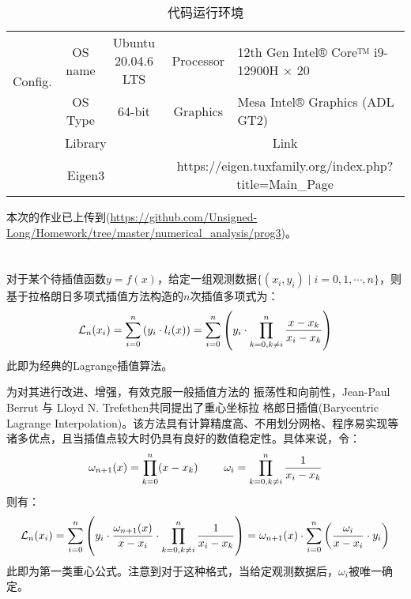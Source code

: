 \documentclass[12pt, onecolumn]{article}
\newcommand\normf{\fangsong}
\begin{document}
		\begin{table}[h]
		\centering
		\caption{\normf 代码运行环境}
		\label{tab:代码运行环境}
		\vspace{2mm}
		\begin{tabular}{ccc|cl}
		\toprule
		\multicolumn{1}{c|}{\multirow{2}{*}{Config.}} & OS name & Ubuntu 20.04.6 LTS & Processor              & 12th Gen Intel® Core™ i9-12900H × 20              \\ \cmidrule{2-5} 
		\multicolumn{1}{c|}{}                         & OS Type & 64-bit             & Graphics               & Mesa Intel® Graphics (ADL GT2)                    \\ \midrule[1pt]\midrule[1pt]
		\multicolumn{3}{c|}{Library}                                                 & \multicolumn{2}{c}{Link}                                                   \\ \midrule
		\multicolumn{3}{c|}{Eigen3}                                                  & \multicolumn{2}{c}{https://eigen.tuxfamily.org/index.php?title=Main\_Page}              \\ \bottomrule
		\end{tabular}
		\end{table}
		
		本次的作业已上传到(\url{https://github.com/Unsigned-Long/Homework/tree/master/numerical_analysis/prog3})。
		
	\section{\normf{拉格朗日重心插值}}
	对于某个待插值函数$y=f(x)$，给定一组观测数据$\{(x_i,y_i)\mid i = 0,1,\cdots,n\}$，则基于拉格朗日多项式插值方法构造的$n$次插值多项式为：
	\begin{equation}
	\large
	\mathcal{L}_n(x_i)=\sum_{i=0}^{n}\left( 
	y_i\cdot l_i(x)
	\right) =\sum_{i=0}^{n}\left( 
		y_i\cdot\prod_{k=0,k\ne i}^{n}\frac{x-x_k}{x_i-x_k}
		\right) 
	\end{equation}
	此即为经典的Lagrange插值算法。
	
	为对其进行改进、增强，有效克服一般插值方法的
	振荡性和向前性，Jean-Paul Berrut 与 Lloyd N.	Trefethen共同提出了重心坐标拉
	格郎日插值(Barycentric Lagrange Interpolation)。该方法具有计算精度高、不用划分网格、程序易实现等诸多优点，且当插值点较大时仍具有良好的数值稳定性。具体来说，令：
	\begin{equation}
	\large
	\omega_{n+1}(x)=\prod_{k=0}^{n}(x-x_k)
	\qquad
	\omega_i=\prod_{k=0,k\ne i}^{n}\frac{1}{x_i-x_k}
	\end{equation}
	则有：
	\begin{equation}
	\large
	\mathcal{L}_n(x_i)=\sum_{i=0}^{n}\left( 
		y_i
		\cdot\frac{\omega_{n+1}(x)}{x-x_i}
		\cdot\prod_{k=0,k\ne i}^{n}\frac{1}{x_i-x_k}
		\right) =\omega_{n+1}(x)\cdot\sum_{i=0}^{n}\left( 
				\frac{\omega_i}{x-x_i}\cdot y_i
				\right)
	\end{equation}
	此即为第一类重心公式。注意到对于这种格式，当给定观测数据后，$\omega_i$被唯一确定。
	
\end{document}
